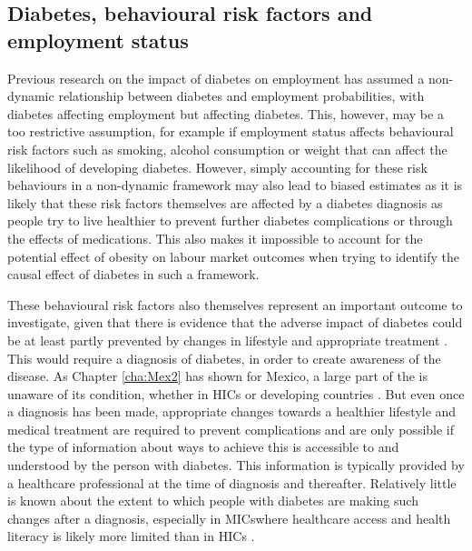 \subsection{Diabetes, behavioural risk factors and employment status}

Previous research on the impact of diabetes on employment has assumed a non-dynamic relationship between diabetes and employment probabilities, with diabetes affecting employment but \DIFdelbegin {}\DIFdelend \DIFaddbegin {}\DIFaddend affecting diabetes. This, however, may be a too restrictive assumption, for example if employment status affects behavioural risk factors such as smoking, alcohol consumption or weight that can affect the likelihood of developing diabetes. However, simply accounting for these risk behaviours in a non-dynamic framework may also lead to biased estimates as it is likely that these risk factors themselves are affected by a diabetes diagnosis as people try to live healthier to prevent further diabetes complications or through the effects of medications. This also makes it impossible to account for the potential effect of obesity on labour market outcomes when trying to identify the causal effect of diabetes in such a framework.

These behavioural risk factors also themselves represent an important outcome to investigate, given that there is evidence that the adverse impact of diabetes could be at least partly prevented by changes in lifestyle and appropriate treatment \parencite{Wareham2016}. This would require a diagnosis of diabetes, in order to create awareness of the disease. As Chapter \ref{cha:Mex2} has shown for Mexico, a large part of the \DIFdelbegin {}\DIFdelend \DIFaddbegin {}\DIFaddend is unaware of its condition, whether in \acp{HIC} or developing countries \parencite{Beagley2014}. But even once a diagnosis has been made, appropriate changes towards a healthier lifestyle and medical treatment are required to prevent complications and are only possible if the type of information about ways to achieve this is accessible to and understood by the person with diabetes. This information is typically provided by a healthcare professional at the time of diagnosis and thereafter. Relatively little is known about the extent to which people with diabetes are making such changes after a diagnosis, especially in \acp{MIC}\DIFaddbegin \DIFadd{, }\DIFaddend where healthcare access and health literacy is likely more limited than in \acp{HIC} \parencite{Mills2014}.

